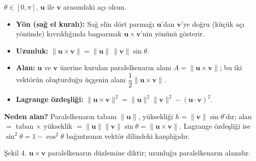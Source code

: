 \begin{teorem}
$\theta\in[0,\pi]$, $\mathbf u$ ile $\mathbf v$ arasındaki açı olsun.
\begin{itemize}
\item \textbf{Yön (sağ el kuralı):} Sağ elin dört parmağı $\mathbf u$'dan $\mathbf v$'ye doğru (küçük açı yönünde) kıvrıldığında başparmak $\mathbf u\times\mathbf v$'nin yönünü gösterir.
\item \textbf{Uzunluk:} $\|\mathbf u\times\mathbf v\|=\|\mathbf u\|\,\|\mathbf v\|\sin\theta$.
\item \textbf{Alan:} $\mathbf u$ ve $\mathbf v$ üzerine kurulan paralelkenarın alanı $A=\|\mathbf u\times\mathbf v\|$; bu iki vektörün oluşturduğu üçgenin alanı $\dfrac12\|\mathbf u\times\mathbf v\|$.
\item \textbf{Lagrange özdeşliği:} $\|\mathbf u\times\mathbf v\|^2=\|\mathbf u\|^2\|\mathbf v\|^2-(\mathbf u\cdot\mathbf v)^2$.
\end{itemize}
\end{teorem}

\textbf{Neden alan?} Paralelkenarın tabanı $\|\mathbf u\|$, yüksekliği $h=\|\mathbf v\|\sin\theta$'dır; alan $=$ taban $\times$ yükseklik $=\|\mathbf u\|\|\mathbf v\|\sin\theta=\|\mathbf u\times\mathbf v\|$. Lagrange özdeşliği ise $\sin^2\theta=1-\cos^2\theta$ bağıntısının vektör dilindeki karşılığıdır.

\begin{center}

{\small Şekil 4. $\mathbf u\times\mathbf v$ paralelkenarın düzlemine diktir; uzunluğu paralelkenarın alanıdır.}
\end{center}

